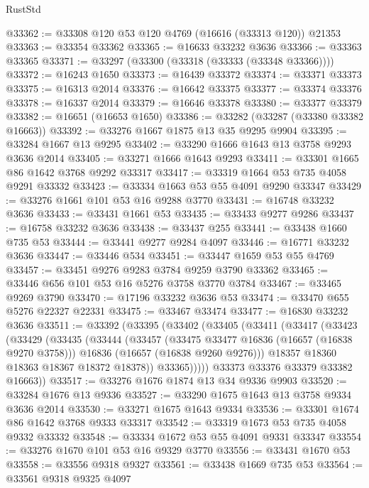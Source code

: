 \begin{lexlean}{RustStd}
\begin{coremodule}
@33362 := @33308 @120 @53 @120 @4769 (@16616 (@33313 @120)) @21353
@33363 := @33354 @33362
@33365 := @16633 @33232 @3636
@33366 := @33363 @33365
@33371 := @33297 (@33300 (@33318 (@33333 (@33348 @33366))))
@33372 := @16243 @1650
@33373 := @16439 @33372
@33374 := @33371 @33373
@33375 := @16313 @2014
@33376 := @16642 @33375
@33377 := @33374 @33376
@33378 := @16337 @2014
@33379 := @16646 @33378
@33380 := @33377 @33379
@33382 := @16651 (@16653 @1650)
@33386 := @33282 (@33287 (@33380 @33382 @16663))
@33392 := @33276 @1667 @1875 @13 @35 @9295 @9904
@33395 := @33284 @1667 @13 @9295
@33402 := @33290 @1666 @1643 @13 @3758 @9293 @3636 @2014
@33405 := @33271 @1666 @1643 @9293
@33411 := @33301 @1665 @86 @1642 @3768 @9292 @33317
@33417 := @33319 @1664 @53 @735 @4058 @9291 @33332
@33423 := @33334 @1663 @53 @55 @4091 @9290 @33347
@33429 := @33276 @1661 @101 @53 @16 @9288 @3770
@33431 := @16748 @33232 @3636
@33433 := @33431 @1661 @53
@33435 := @33433 @9277 @9286
@33437 := @16758 @33232 @3636
@33438 := @33437 @255
@33441 := @33438 @1660 @735 @53
@33444 := @33441 @9277 @9284 @4097
@33446 := @16771 @33232 @3636
@33447 := @33446 @534
@33451 := @33447 @1659 @53 @55 @4769
@33457 := @33451 @9276 @9283 @3784 @9259 @3790 @33362
@33465 := @33446 @656 @101 @53 @16 @5276 @3758 @3770 @3784
@33467 := @33465 @9269 @3790
@33470 := @17196 @33232 @3636 @53
@33474 := @33470 @655 @5276 @22327 @22331
@33475 := @33467 @33474
@33477 := @16830 @33232 @3636
@33511 := @33392
    (@33395
      (@33402
        (@33405
          (@33411
            (@33417
              (@33423
                (@33429
                  (@33435
                    (@33444
                      (@33457
                        (@33475 @33477 @16836 (@16657 (@16838 @9270 @3758)))
                        @16836
                        (@16657 (@16838 @9260 @9276)))
                      @18357
                      @18360
                      @18363
                      @18367
                      @18372
                      @18378))
                  @33365)))))
        @33373
        @33376
        @33379
        @33382
        @16663))
@33517 := @33276 @1676 @1874 @13 @34 @9336 @9903
@33520 := @33284 @1676 @13 @9336
@33527 := @33290 @1675 @1643 @13 @3758 @9334 @3636 @2014
@33530 := @33271 @1675 @1643 @9334
@33536 := @33301 @1674 @86 @1642 @3768 @9333 @33317
@33542 := @33319 @1673 @53 @735 @4058 @9332 @33332
@33548 := @33334 @1672 @53 @55 @4091 @9331 @33347
@33554 := @33276 @1670 @101 @53 @16 @9329 @3770
@33556 := @33431 @1670 @53
@33558 := @33556 @9318 @9327
@33561 := @33438 @1669 @735 @53
@33564 := @33561 @9318 @9325 @4097

\end{coremodule}
\end{lexlean}
